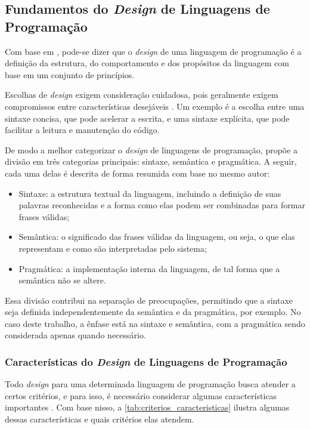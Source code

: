 \subsection{Fundamentos do \textit{Design} de Linguagens de Programação}

Com base em \cite{conceptsoflanguages}, pode-se dizer que o \textit{design} de uma linguagem de programação é a definição da estrutura, do comportamento e dos propósitos da linguagem com base em um conjunto de princípios.

Escolhas de \textit{design} exigem consideração cuidadosa, pois geralmente exigem compromissos entre características desejáveis \cite{conceptsoflanguages}. Um exemplo é a escolha entre uma sintaxe concisa, que pode acelerar a escrita, e uma sintaxe explícita, que pode facilitar a leitura e manutenção do código.

De modo a melhor categorizar o \textit{design} de linguagens de programação,  propõe a divisão em três categorias principais: sintaxe, semântica e pragmática. A seguir, cada uma delas é descrita de forma resumida com base no mesmo autor:

\begin{itemize}
	\item Sintaxe: a estrutura textual da linguagem, incluindo a definição de suas palavras reconhecidas e a forma como elas podem ser combinadas para formar frases válidas;

	\item Semântica: o significado das frases válidas da linguagem, ou seja, o que elas representam e como são interpretadas pelo sistema;

	\item Pragmática: a implementação interna da linguagem, de tal forma que a semântica não se altere.
\end{itemize}

Essa divisão contribui na separação de preocupações, permitindo que a sintaxe seja definida independentemente da semântica e da pragmática, por exemplo. No caso deste trabalho, a ênfase está na sintaxe e semântica, com a pragmática sendo considerada apenas quando necessário.

\subsubsection{Características do \textit{Design} de Linguagens de Programação}

Todo \textit{design} para uma determinada linguagem de programação busca atender a certos critérios, e para isso, é necessário considerar algumas características importantes \cite{conceptsoflanguages}. Com base nisso, a \autoref{tab:criterios_caracteristicas} ilustra algumas dessas características e quais critérios elas atendem.

